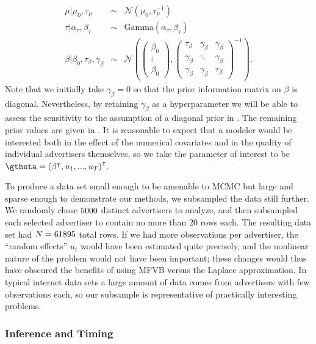 \documentclass{article}\usepackage[]{graphicx}\usepackage[]{color}
\theoremstyle{definition}
\theoremstyle{plain}
\theoremstyle{plain}
\theoremstyle{plain}
\theoremstyle{definition}
\theoremstyle{plain}
\theoremstyle{plain}
\begin{document}
\begin{eqnarray*}
\mu\vert\mu_{0},\tau_{\mu} & \sim & \mathcal{N}\left(\mu_{0},\tau_{\mu}^{-1}\right)\\
\tau\vert\alpha_{\tau},\beta_{\tau} & \sim & \textrm{Gamma}\left(\alpha_{\tau},\beta_{\tau}\right)\\
\beta\vert\beta_{0},\tau_{\beta},\gamma_{\beta} & \sim & \mathcal{N}\left(\left(\begin{array}{c}
\beta_{0}\\
\vdots\\
\beta_{0}
\end{array}\right),\left(\begin{array}{ccc}
\tau_{\beta} & \gamma_{\beta} & \gamma_{\beta}\\
\gamma_{\beta} & \ddots & \gamma_{\beta}\\
\gamma_{\beta} & \gamma_{\beta} & \tau_{\beta}
\end{array}\right)^{-1}\right).
\end{eqnarray*}
Note that we initially take $\gamma_{\beta}=0$ so that the prior
information matrix on $\beta$ is diagonal. Nevertheless, by retaining $\gamma_{\beta}$
as a hyperparameter we will be able to assess the sensitivity to the
assumption of a diagonal prior in .
The remaining prior values are given in .
It is reasonable to expect that a modeler would be interested both
in the effect of the numerical covariates and in the quality of individual
advertisers themselves, so we take the parameter of interest to be
$\gtheta=\left(\beta^{\trans},u_{1},...,u_{T}\right)^{\trans}$.

To produce a data set small enough to be amenable to MCMC but large
and sparse enough to demonstrate our methods, we subsampled the data
still further. We randomly chose $5000$ distinct advertisers
to analyze, and then subsampled each selected advertiser to contain
no more than 20 rows each. The resulting data set had $N=61895$
total rows. If we had more observations per advertiser, the ``random
effects'' $u_{t}$ would have been estimated quite precisely, and
the nonlinear nature of the problem would not have been important; these changes would thus have
obscured the benefits of using MFVB versus the Laplace approximation.
In typical internet data sets a large amount of data comes from advertisers
with few observations each, so our subsample is representative of
practically interesting problems.

\subsubsection{Inference and Timing\label{subsec:glmm_inference}}
\end{document}
